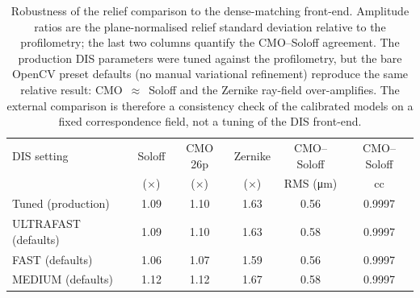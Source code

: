 \begin{table}[t]
\centering
\caption{Robustness of the relief comparison to the dense-matching front-end. Amplitude ratios are the plane-normalised relief standard deviation relative to the profilometry; the last two columns quantify the CMO--Soloff agreement. The production DIS parameters were tuned against the profilometry, but the bare OpenCV preset defaults (no manual variational refinement) reproduce the same relative result: CMO~$\approx$~Soloff and the Zernike ray-field over-amplifies. The external comparison is therefore a consistency check of the calibrated models on a fixed correspondence field, not a tuning of the DIS front-end.}
\label{tab:dis_robustness}
\begin{tabular}{lccccc}
\hline
DIS setting & Soloff & CMO 26p & Zernike & CMO--Soloff & CMO--Soloff \\
 & ($\times$) & ($\times$) & ($\times$) & RMS (\si{\micro\metre}) & cc \\
\hline
Tuned (production) & 1.09 & 1.10 & 1.63 & 0.56 & 0.9997 \\
ULTRAFAST (defaults) & 1.09 & 1.10 & 1.63 & 0.58 & 0.9997 \\
FAST (defaults) & 1.06 & 1.07 & 1.59 & 0.56 & 0.9997 \\
MEDIUM (defaults) & 1.12 & 1.12 & 1.67 & 0.58 & 0.9997 \\
\hline
\end{tabular}
\end{table}
